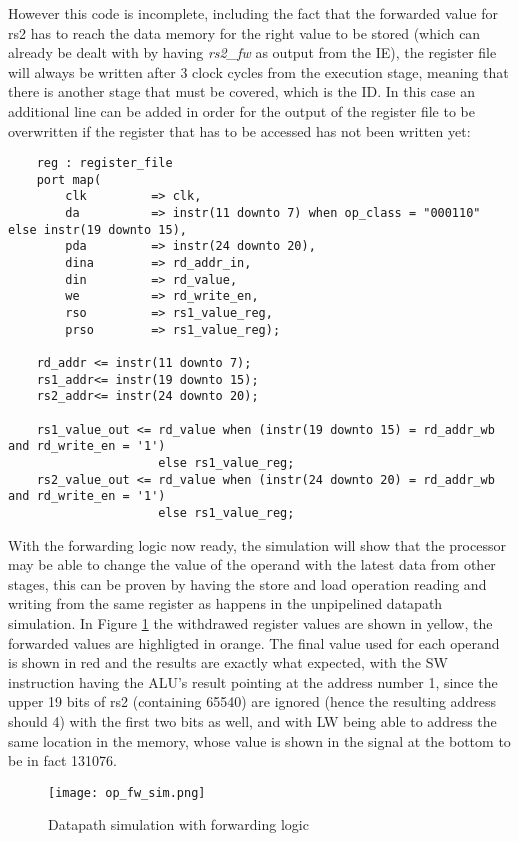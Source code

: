 However this code is incomplete, including the fact that the forwarded value for rs2 has to reach the data memory for the right value to be stored (which can already be dealt with by having \emph{rs2{\_}fw} as output from the IE), the register file will always be written after 3 clock cycles from the execution stage, meaning that there is another stage that must be covered, which is the ID. In this case an additional line can be added in order for the output of the register file to be overwritten if the register that has to be accessed has not been written yet:

\begin{verbatim}
    reg : register_file
    port map(
        clk         => clk,
        da          => instr(11 downto 7) when op_class = "000110"  else instr(19 downto 15),
        pda         => instr(24 downto 20),
        dina        => rd_addr_in,
        din         => rd_value,
        we          => rd_write_en,
        rso         => rs1_value_reg,
        prso        => rs1_value_reg);

    rd_addr <= instr(11 downto 7);
    rs1_addr<= instr(19 downto 15);
    rs2_addr<= instr(24 downto 20);
    
    rs1_value_out <= rd_value when (instr(19 downto 15) = rd_addr_wb and rd_write_en = '1') 
                     else rs1_value_reg;
    rs2_value_out <= rd_value when (instr(24 downto 20) = rd_addr_wb and rd_write_en = '1') 
                     else rs1_value_reg;
\end{verbatim}
With the forwarding logic now ready, the simulation will show that the processor may be able to change the value of the operand with the latest data from other stages, this can be proven by having the store and load operation reading and writing from the same register as happens in the unpipelined datapath simulation.
In Figure \ref{fig:op_fw_sim} the withdrawed register values are shown in yellow, the forwarded values are highligted in orange. The final value used for each operand is shown in red and the results are exactly what expected, with the SW instruction having the ALU's result pointing at the address number 1, since the upper 19 bits of rs2 (containing 65540) are ignored (hence the resulting address should 4) with the first two bits as well, and with LW being able to address the same location in the memory, whose value is shown in the signal at the bottom to be in fact 131076.
\newpage

\begin{figure}[!ht]
    \centering
    \texttt{[image: op\_fw\_sim.png]}
    \caption{Datapath simulation with forwarding logic}
    \label{fig:op_fw_sim}
\end{figure}

